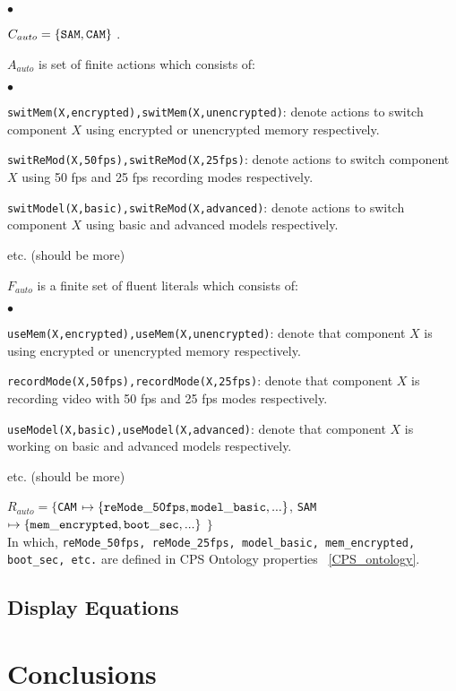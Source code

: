 \begin{list}{$\bullet$}{\itemsep=0pt \parsep=1pt \topsep=1pt \leftmargin=12pt} 
\item $C_{auto} = \{{\tt SAM}, {\tt CAM}\}$ .
\item $A_{auto}$ is set of finite actions which consists of:
\begin{list}{$\bullet$}{\itemsep=0pt \parsep=1pt \topsep=1pt \leftmargin=12pt} 
\item {\tt \small switMem(X,encrypted),switMem(X,unencrypted)}: denote actions to switch component $X$ using encrypted or unencrypted memory respectively. 
\item {\tt \small switReMod(X,50fps),switReMod(X,25fps)}: denote actions to switch component $X$ using 50 fps and 25 fps recording modes respectively. 
\item {\tt \small switModel(X,basic),switReMod(X,advanced)}: denote actions to switch component $X$ using basic and advanced models respectively. 
\item etc. (should be more)
\end{list}
\item $F_{auto}$ is a finite set of fluent literals which consists of:
\begin{list}{$\bullet$}{\itemsep=0pt \parsep=1pt \topsep=1pt \leftmargin=12pt} 
\item {\tt \small useMem(X,encrypted),useMem(X,unencrypted)}: denote that component $X$ is using encrypted or unencrypted memory respectively. 
\item {\tt \small recordMode(X,50fps),recordMode(X,25fps)}: denote that component $X$ is recording video with 50 fps and 25 fps modes respectively. 
\item {\tt \small useModel(X,basic),useModel(X,advanced)}: denote that component $X$ is working on basic and advanced models respectively. 
\item etc. (should be more)
\end{list}
\item $R_{auto} =\{${\tt CAM} $\mapsto \{{\tt reMode\_50fps, model\_basic,...}\}$, {\tt SAM} $\mapsto \{{\tt mem\_encrypted, boot\_sec,...}\}$  $\}$ \\
In which, {\tt \small reMode\_50fps, reMode\_25fps, model\_basic, mem\_encrypted, boot\_sec, etc.}  are defined in CPS Ontology properties ~\ref{CPS_ontology}. 
\end{list}

\subsection{Display Equations}


\section{Conclusions}
